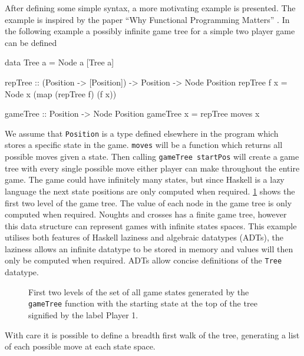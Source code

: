 \documentclass[float=false, crop=false]{standalone}
\begin{document}
After defining some simple syntax, a more motivating example is presented. The example is 
inspired by the paper ``Why Functional Programming Matters''
\cite[]{whyfpm}. 
In the following example a possibly infinite game tree for a simple
two player game can be defined 
\begin{HaskellLst}
data Tree a = Node a [Tree a]

repTree :: (Position -> [Position]) -> Position -> Node Position
repTree f x = Node x (map (repTree f) (f x))

gameTree :: Position -> Node Position
gameTree x = repTree moves x
\end{HaskellLst}
We assume that \verb|Position| is a type defined elsewhere in the program 
which stores a specific state in the game. 
\verb|moves| will be a function which returns all possible moves given a state.
Then calling \verb|gameTree startPos| will create
a game tree with every single possible move either player can make throughout
the entire game. The game could have infinitely many states, but since
Haskell is a lazy language the next state positions are only computed
when required. \cref{figure:tictactoeTree} shows the first two level of the game tree.
The value of each node in the game tree is only computed when required. Noughts and
crosses has a finite game tree, however this data structure can represent games 
with infinite states spaces. This example utilises both features
of Haskell laziness and algebraic datatypes (ADTs), the laziness allows an 
infinite datatype to be stored in memory and values will then only be computed when
required. ADTs allow concise definitions of the \verb|Tree| datatype.
\begin{figure}
  \centering
{}
\caption[Noughts and crosses game states]{First two levels of the set of all game states generated by the 
  \texttt{gameTree} function with the starting state at the top of 
  the tree signified by the label \textcolor{pgrey}{\textsf{Player 1}}.}
\label{figure:tictactoeTree}
\end{figure}
With care it is possible to define a breadth first walk of the tree, generating 
a list of each possible move at each state space. 
\end{document}
